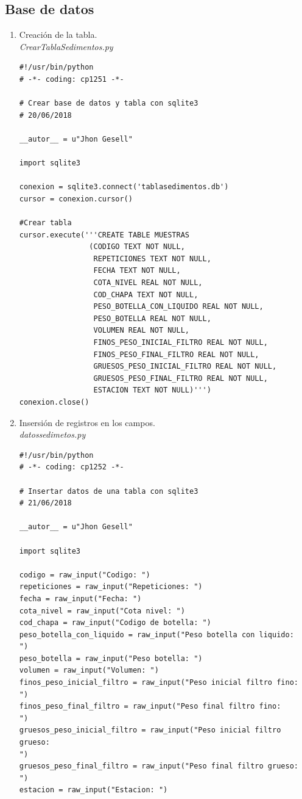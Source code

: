 \documentclass[12pt,a4paper]{report}
\begin{document}
\subsection{Base de datos}
\begin{enumerate}
\item Creación de la tabla. \\
\textit{CrearTablaSedimentos.py}
\begin{lstlisting}
#!/usr/bin/python
# -*- coding: cp1251 -*-

# Crear base de datos y tabla con sqlite3
# 20/06/2018

__autor__ = u"Jhon Gesell"

import sqlite3

conexion = sqlite3.connect('tablasedimentos.db')
cursor = conexion.cursor()

#Crear tabla
cursor.execute('''CREATE TABLE MUESTRAS
                (CODIGO TEXT NOT NULL,
                 REPETICIONES TEXT NOT NULL,
                 FECHA TEXT NOT NULL,
                 COTA_NIVEL REAL NOT NULL,
                 COD_CHAPA TEXT NOT NULL,
                 PESO_BOTELLA_CON_LIQUIDO REAL NOT NULL,
                 PESO_BOTELLA REAL NOT NULL,
                 VOLUMEN REAL NOT NULL,
                 FINOS_PESO_INICIAL_FILTRO REAL NOT NULL,
                 FINOS_PESO_FINAL_FILTRO REAL NOT NULL,
                 GRUESOS_PESO_INICIAL_FILTRO REAL NOT NULL,
                 GRUESOS_PESO_FINAL_FILTRO REAL NOT NULL,
                 ESTACION TEXT NOT NULL)''')
conexion.close()

\end{lstlisting}

\item Insersión de registros en los campos. \\
\textit{datossedimetos.py}
\begin{lstlisting}
#!/usr/bin/python
# -*- coding: cp1252 -*-

# Insertar datos de una tabla con sqlite3
# 21/06/2018

__autor__ = u"Jhon Gesell"

import sqlite3

codigo = raw_input("Codigo: ")
repeticiones = raw_input("Repeticiones: ")
fecha = raw_input("Fecha: ")
cota_nivel = raw_input("Cota nivel: ")
cod_chapa = raw_input("Codigo de botella: ")
peso_botella_con_liquido = raw_input("Peso botella con liquido:
")
peso_botella = raw_input("Peso botella: ")
volumen = raw_input("Volumen: ")
finos_peso_inicial_filtro = raw_input("Peso inicial filtro fino:
")
finos_peso_final_filtro = raw_input("Peso final filtro fino:
")
gruesos_peso_inicial_filtro = raw_input("Peso inicial filtro
grueso:
")
gruesos_peso_final_filtro = raw_input("Peso final filtro grueso:
")
estacion = raw_input("Estacion: ")


\end{lstlisting}
\end{enumerate}
\end{document}
